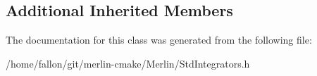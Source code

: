 \subsection*{Additional Inherited Members}


The documentation for this class was generated from the following file\+:\begin{DoxyCompactItemize}
\item 
/home/fallon/git/merlin-\/cmake/\+Merlin/Std\+Integrators.\+h\end{DoxyCompactItemize}
